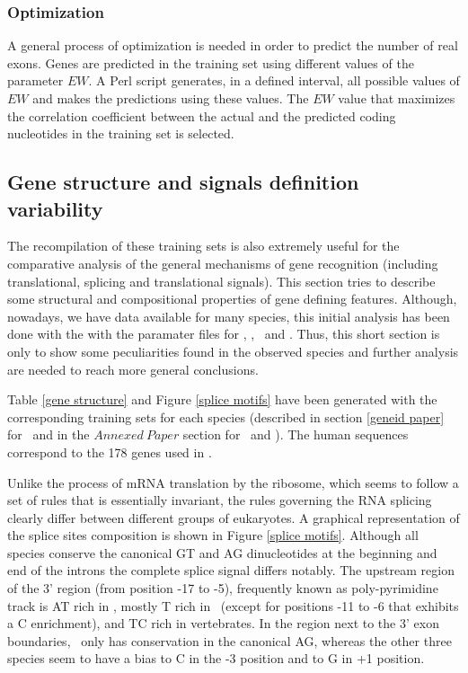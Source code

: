 \subsubsection{Optimization}

A general process of optimization is needed in order to predict the
number of real exons. Genes are predicted in the training set using
different values of the parameter $EW$. A Perl script generates, in a
defined interval, all possible values of $EW$ and makes the
predictions using these values. The $EW$ value that maximizes the
correlation coefficient between the actual and the predicted coding
nucleotides in the training set is selected.

\subsection{Gene structure and signals definition variability}

The recompilation of these training sets is also extremely useful for
the comparative analysis of the general mechanisms of gene recognition
(including translational, splicing and translational signals). This
section tries to describe some structural and compositional properties
of gene defining features. Although, nowadays, we have data available
for many species, this initial analysis has been done with the with
the paramater files for \Dm, \Hs, \Dd\ and \Tn. Thus, this short
section is only to show some peculiarities found in the observed
species and  further analysis are needed to reach more general
conclusions.

Table \ref{gene structure} and Figure \ref{splice motifs} have been
generated with the corresponding training sets for each species
(described in section \ref{geneid paper} for \DmL\ and in the $Annexed\
Paper$ section for \DdL\ and \TnL). The human sequences correspond to
the 178 genes used in \cite{guigo:2000c}.

Unlike the process of mRNA translation by the ribosome, which seems to
follow a set of rules that is essentially invariant, the rules
governing the RNA splicing clearly differ between different groups of
eukaryotes. A graphical representation of the splice sites composition
is shown in Figure \ref{splice motifs}.  Although all species conserve
the canonical GT and AG dinucleotides at the beginning and end of the
introns the complete splice signal differs notably. The upstream
region of the 3' region (from position -17 to -5), frequently known as
poly-pyrimidine track is AT rich in \Dicty, mostly T rich in \Droso\
(except for positions -11 to -6 that exhibits a C enrichment), and TC
rich in vertebrates. In the region next to the 3' exon boundaries,
\Dicty\ only has conservation in the canonical AG, whereas the other 
three species seem to have a bias to C in the -3 position and to G in
+1 position.

